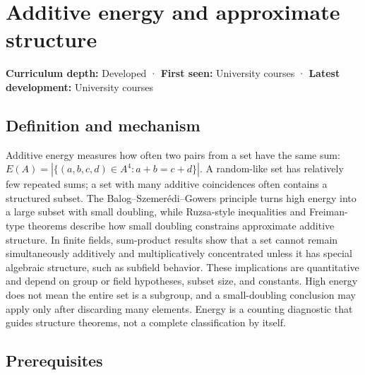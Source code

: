 \hypertarget{appendix-b0732b22e7d6}{}\label{referencestart:appendix-b0732b22e7d6}
\section{Additive energy and approximate structure}\label{appendix-b0732b22e7d6-additive-energy-and-approximate-structure}

\hypertarget{appendix-b0732b22e7d6-additive-energy-and-approximate-structure}{}

\textbf{Curriculum depth:} Developed · \textbf{First seen:} University courses · \textbf{Latest development:} University courses

\begin{allmightroledefinition}

\subsection{Definition and mechanism}\label{appendix-b0732b22e7d6-definition-and-mechanism}

\hypertarget{appendix-b0732b22e7d6-definition-and-mechanism}{}

Additive energy measures how often two pairs from a set have the same sum: \(E(A)=|\{(a,b,c,d)\in A^4:a+b=c+d\}|\). A random-like set has relatively few repeated sums; a set with many additive coincidences often contains a structured subset. The Balog--Szemerédi--Gowers principle turns high energy into a large subset with small doubling, while Ruzsa-style inequalities and Freiman-type theorems describe how small doubling constrains approximate additive structure. In finite fields, sum-product results show that a set cannot remain simultaneously additively and multiplicatively concentrated unless it has special algebraic structure, such as subfield behavior. These implications are quantitative and depend on group or field hypotheses, subset size, and constants. High energy does not mean the entire set is a subgroup, and a small-doubling conclusion may apply only after discarding many elements. Energy is a counting diagnostic that guides structure theorems, not a complete classification by itself.

\end{allmightroledefinition}

\subsection{Prerequisites}\label{appendix-b0732b22e7d6-prerequisites}

